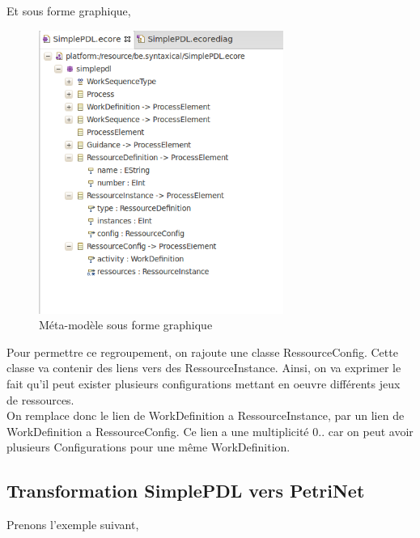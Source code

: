 Et sous forme graphique,\\

\newpage

\begin{figure}[!h] 
\begin{center}
\includegraphics[width=8cm]{Capture-14.png}
\caption{Méta-modèle sous forme graphique} 
\label{img1} 
\end{center}
\end{figure} 

Pour permettre ce regroupement, on rajoute une classe RessourceConfig. Cette classe va contenir des liens vers des RessourceInstance. Ainsi, on va exprimer le fait qu'il peut exister plusieurs configurations mettant en oeuvre différents jeux de ressources.\\

On remplace donc le lien de WorkDefinition a RessourceInstance, par un lien de WorkDefinition a RessourceConfig. Ce lien a une multiplicité 0..\* car on peut avoir plusieurs Configurations pour une même WorkDefinition.

\subsection{Transformation SimplePDL vers PetriNet}

Prenons l'exemple suivant, 

